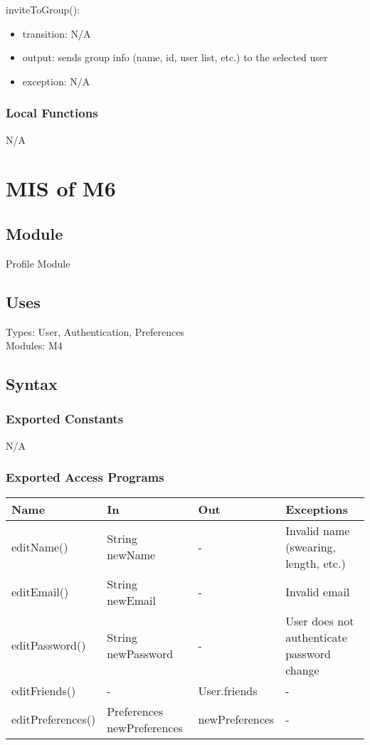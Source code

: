 \documentclass[12pt, titlepage]{article}
\begin{document}
\noindent inviteToGroup():
\begin{itemize}
\item transition: N/A
\item output: sends group info (name, id, user list, etc.) to the selected user
\item exception: N/A
\end{itemize}

\subsubsection{Local Functions}
N/A


\section{MIS of M6} \label{Module}

\subsection{Module}
Profile Module

\subsection{Uses}
Types: User, Authentication, Preferences \\
Modules: M4

\subsection{Syntax}

\subsubsection{Exported Constants}
N/A

\subsubsection{Exported Access Programs}

\begin{center}
\begin{tabular}{p{3cm} p{4cm} p{4cm} p{3cm}}
\hline
\textbf{Name} & \textbf{In} & \textbf{Out} & \textbf{Exceptions} \\
\hline
editName() & String newName & - & Invalid name (swearing, length, etc.) \\
editEmail() & String newEmail & - & Invalid email \\
editPassword() & String newPassword & - & User does not authenticate password change \\
editFriends() & - & User.friends & - \\
editPreferences() & Preferences newPreferences & newPreferences & - \\
\hline
\end{tabular}
\end{center}
\end{document}
